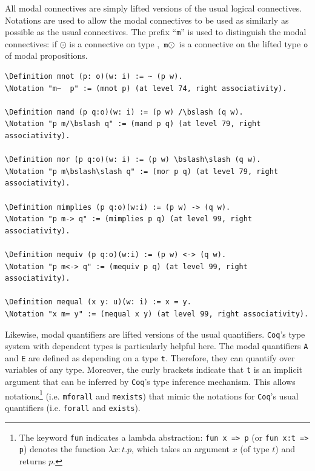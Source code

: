 \documentclass{llncs}
\newcommand{\red}[1]{\textcolor[rgb]{1,0,0}{#1}}
\newcommand{\blue}[1]{\textcolor[rgb]{0,0,1}{#1}}
\newcommand{\Definition}{\red{Definition}}
\newcommand{\Notation}{\blue{Notation}}
\newcommand{\fun}{\blue{fun}}
\newcommand{\bslash}{\symbol{92}}
\newcommand{\Coq}{\texttt{Coq}\xspace}
\begin{document}
\noindent 
All modal connectives are simply lifted versions of the
usual logical connectives. Notations are used to allow the modal
connectives to be used as similarly as possible as the usual
connectives. The prefix ``\texttt{m}'' is used to distinguish the
modal connectives: if $\odot$ is a connective on type ,
$\texttt{m}\odot$ is a connective on the lifted type $\texttt{o}$ of
modal propositions.

\begin{Verbatim}[commandchars=\\\{\},fontsize=\verbsize]
\Definition mnot (p: o)(w: i) := ~ (p w).
\Notation "m~  p" := (mnot p) (at level 74, right associativity).

\Definition mand (p q:o)(w: i) := (p w) /\bslash (q w).
\Notation "p m/\bslash q" := (mand p q) (at level 79, right associativity).

\Definition mor (p q:o)(w: i) := (p w) \bslash\slash (q w).
\Notation "p m\bslash\slash q" := (mor p q) (at level 79, right associativity).

\Definition mimplies (p q:o)(w:i) := (p w) -> (q w).
\Notation "p m-> q" := (mimplies p q) (at level 99, right associativity).

\Definition mequiv (p q:o)(w:i) := (p w) <-> (q w).
\Notation "p m<-> q" := (mequiv p q) (at level 99, right associativity).

\Definition mequal (x y: u)(w: i) := x = y.
\Notation "x m= y" := (mequal x y) (at level 99, right associativity).
\end{Verbatim}

\noindent 
Likewise, modal quantifiers are lifted versions of the usual
quantifiers. \Coq's type system with dependent types is particularly
helpful here. The modal quantifiers \texttt{A} and \texttt{E} are
defined as depending on a type \texttt{t}. Therefore, they can
quantify over variables of any type. Moreover, the curly brackets
indicate that \texttt{t} is an implicit argument that can be inferred
by \Coq's type inference mechanism. This allows notations\footnote{The
keyword \texttt{\fun} indicates a lambda abstraction: \texttt{\fun \ x
=> p} (or \texttt{\fun \ x:t => p}) denotes the function 
$\lambda x:t.p$, which takes an argument $x$ (of type $t$) and returns $p$.}
(i.e. \texttt{mforall} and \texttt{mexists}) that mimic the notations
for \Coq's usual quantifiers (i.e. \texttt{forall} and
\texttt{exists}).
\end{document}
